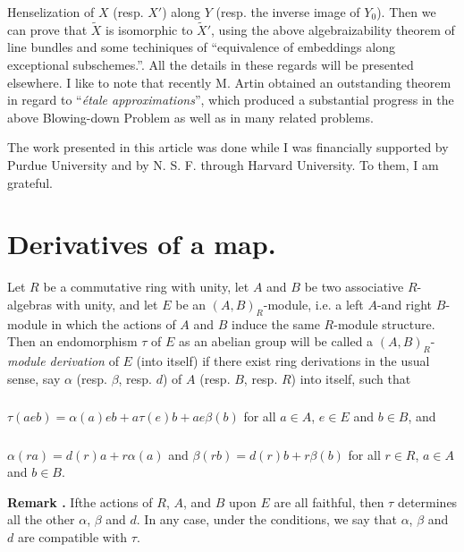 Henselization of $X$ (resp. $X'$) along $Y$ (resp. the inverse image of $Y_{0}$). Then we can prove that $\widetilde{X}$ is isomorphic to $\widetilde{X}'$, using the above algebraizability theorem of line bundles and some techiniques of ``equivalence of embeddings along exceptional subschemes.''. All the details in these regards will be presented elsewhere. I like to note that recently M. Artin obtained an outstanding theorem in regard to ``{\em \'etale approximations}'', which produced a substantial progress in the above Blowing-down Problem as well as in many related problems.

The work presented in this article was done while I was financially supported by Purdue University and by N. S. F. through Harvard University. To them, I am grateful.

\section{Derivatives of a map.}\label{art10-sec1}

Let $R$ be a commutative ring with unity, let $A$ and $B$ be two associative $R$-algebras with unity, and let $E$ be an $(A,B)_{R}$-module, i.e. a left $A$-and right $B$-module in which the actions of $A$ and $B$ induce the same $R$-module structure. Then an endomorphism $\tau$ of $E$ as an abelian group will be called a $(A,B)_{R}$-{\em module derivation} of $E$ (into itself) if there exist ring derivations in the usual sense, say $\alpha$ (resp. $\beta$, resp. $d$) of $A$ (resp. $B$, resp. $R$) into itself, such that

\setcounter{subsection}{1}
\subsubsection{}\label{art10-sec1.1.1} $\tau(aeb)=\alpha(a)eb+a\tau(e)b+ae\beta(b)$ for all $a\in A$, $e\in E$ and $b\in B$, and

\subsubsection{}\label{art10-sec1.1.2} $\alpha(ra)=d(r)a+r\alpha(a)$ and $\beta(rb)=d(r)b+r\beta(b)$ for all $r\in R$, $a\in A$ and $b\in B$.

\medskip
\noindent
{\bf Remark .\label{art10-sec1-rem1.2}}
If\pageoriginale the actions of $R$, $A$, and $B$ upon $E$ are all faithful, then $\tau$ determines all the other $\alpha$, $\beta$ and $d$. In any case, under the conditions, we say that $\alpha$, $\beta$ and $d$ are compatible with $\tau$.
\smallskip

